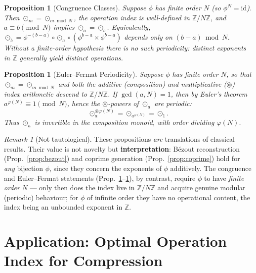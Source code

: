 \documentclass[11pt,twocolumn]{article}
\theoremstyle{plain}
\newtheorem{proposition}[theorem]{Proposition}
\theoremstyle{definition}
\theoremstyle{remark}
\newtheorem{remark}[theorem]{Remark}
\newcommand{\Z}{\mathbb{Z}}
\begin{document}
\begin{proposition}[Congruence Classes]\label{prop:congruence}
Suppose $\phi$ has \emph{finite order} $N$ (so $\phi^N = \mathrm{id}$). Then $\odot_m = \odot_{m \bmod N}$, the operation index is well-defined in $\Z/N\Z$, and $a \equiv b \pmod{N}$ implies $\odot_a = \odot_b$. Equivalently, $\odot_b = \phi^{-(b-a)} \circ \odot_a \circ (\phi^{b-a} \times \phi^{b-a})$ depends only on $(b-a) \bmod N$. Without a finite-order hypothesis there is no such periodicity: distinct exponents in $\Z$ generally yield distinct operations.
\end{proposition}

\begin{proposition}[Euler--Fermat Periodicity]\label{prop:euler}
Suppose $\phi$ has finite order $N$, so that $\odot_m = \odot_{m \bmod N}$ and both the additive (composition) and multiplicative ($\circledast$) index arithmetic descend to $\Z/N\Z$. If $\gcd(a, N) = 1$, then by Euler's theorem $a^{\varphi(N)} \equiv 1 \pmod{N}$, hence the $\circledast$-powers of $\odot_a$ are periodic:
\[
\odot_a^{\circledast \varphi(N)} = \odot_{a^{\varphi(N)}} = \odot_1.
\]
Thus $\odot_a$ is invertible in the composition monoid, with order dividing $\varphi(N)$.
\end{proposition}

\begin{remark}[Not tautological]
These propositions \emph{are} translations of classical results. Their value is not novelty but \textbf{interpretation}: B\'ezout reconstruction (Prop.~\ref{prop:bezout}) and coprime generation (Prop.~\ref{prop:coprime}) hold for \emph{any} bijection $\phi$, since they concern the exponents of $\phi$ additively. The congruence and Euler--Fermat statements (Prop.~\ref{prop:congruence}--\ref{prop:euler}), by contrast, require $\phi$ to have \emph{finite order} $N$ --- only then does the index live in $\Z/N\Z$ and acquire genuine modular (periodic) behaviour; for $\phi$ of infinite order they have no operational content, the index being an unbounded exponent in $\Z$.
\end{remark}


\section{Application: Optimal Operation Index for Compression}
\label{sec:application}
\end{document}
